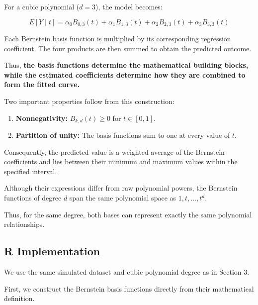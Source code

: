 \documentclass[
  letterpaper,
  DIV=11,
  numbers=noendperiod]{scrreprt}
\providecommand{\tightlist}{%
  \setlength{\itemsep}{0pt}\setlength{\parskip}{0pt}}
\begin{document}
For a cubic polynomial (\(d=3\)), the model becomes:

\[
E[Y\mid t]=
\alpha_0B_{0,3}(t)+
\alpha_1B_{1,3}(t)+
\alpha_2B_{2,3}(t)+
\alpha_3B_{3,3}(t)
\]

Each Bernstein basis function is multiplied by its corresponding
regression coefficient. The four products are then summed to obtain the
predicted outcome.

Thus, \textbf{the basis functions determine the mathematical building
blocks, while the estimated coefficients determine how they are combined
to form the fitted curve.}

Two important properties follow from this construction:

\begin{enumerate}
\def\labelenumi{\arabic{enumi}.}
\tightlist
\item
  \textbf{Nonnegativity:} \(B_{k,d}(t)\geq 0\) for \(t\in[0,1]\).
\item
  \textbf{Partition of unity:} The basis functions sum to one at every
  value of \(t\).
\end{enumerate}

Consequently, the predicted value is a weighted average of the Bernstein
coefficients and lies between their minimum and maximum values within
the specified interval.

Although their expressions differ from raw polynomial powers, the
Bernstein functions of degree \(d\) span the same polynomial space as
\(1,t,\ldots,t^d\).

Thus, for the same degree, both bases can represent exactly the same
polynomial relationships.

\subsection{R Implementation}\label{r-implementation-1}

We use the same simulated dataset and cubic polynomial degree as in
Section 3.

First, we construct the Bernstein basis functions directly from their
mathematical definition.
\end{document}

